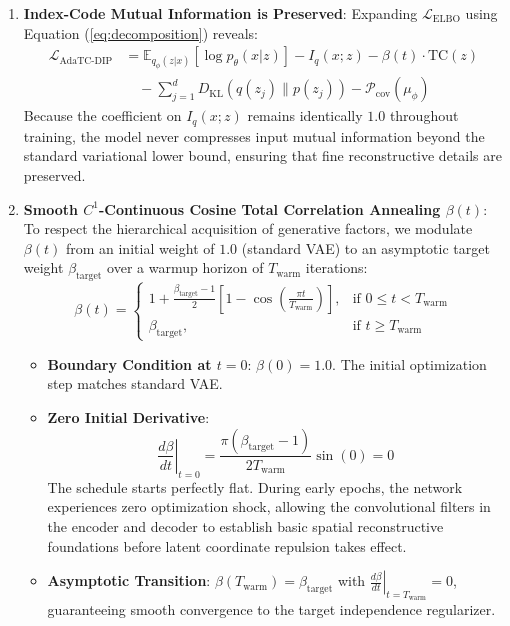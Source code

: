 \documentclass[10pt,journal,compsoc]{IEEEtran}
\begin{document}
\begin{enumerate}
    \item \textbf{Index-Code Mutual Information is Preserved}:
    Expanding $\mathcal{L}_{\text{ELBO}}$ using Equation (\ref{eq:decomposition}) reveals:
    \begin{equation}
    \begin{aligned}
    \mathcal{L}_{\text{AdaTC-DIP}} &= \mathbb{E}_{q_\phi(z|x)}[\log p_\theta(x|z)] - I_q(x; z) - \beta(t) \cdot \text{TC}(z) \\
    &\quad - \sum_{j=1}^d D_{\text{KL}}(q(z_j) \parallel p(z_j)) - \mathcal{P}_{\text{cov}}(\mu_\phi)
    \end{aligned}
    \end{equation}
    Because the coefficient on $I_q(x; z)$ remains identically $1.0$ throughout training, the model never compresses input mutual information beyond the standard variational lower bound, ensuring that fine reconstructive details are preserved.

    \item \textbf{Smooth $C^1$-Continuous Cosine Total Correlation Annealing $\beta(t)$}:
    To respect the hierarchical acquisition of generative factors, we modulate $\beta(t)$ from an initial weight of $1.0$ (standard VAE) to an asymptotic target weight $\beta_{\text{target}}$ over a warmup horizon of $T_{\text{warm}}$ iterations:
    \begin{equation}
    \beta(t) = \begin{cases} 1 + \frac{\beta_{\text{target}} - 1}{2} \left[ 1 - \cos\left( \frac{\pi t}{T_{\text{warm}}} \right) \right], & \text{if } 0 \le t < T_{\text{warm}} \\ \beta_{\text{target}}, & \text{if } t \ge T_{\text{warm}} \end{cases}
    \label{eq:cosine_schedule}
    \end{equation}
    \begin{itemize}
        \item \textbf{Boundary Condition at $t = 0$}: $\beta(0) = 1.0$. The initial optimization step matches standard VAE.
        \item \textbf{Zero Initial Derivative}:
        \begin{equation}
        \left.\frac{d\beta}{dt}\right|_{t=0} = \frac{\pi(\beta_{\text{target}} - 1)}{2 T_{\text{warm}}} \sin(0) = 0
        \end{equation}
        The schedule starts perfectly flat. During early epochs, the network experiences zero optimization shock, allowing the convolutional filters in the encoder and decoder to establish basic spatial reconstructive foundations before latent coordinate repulsion takes effect.
        \item \textbf{Asymptotic Transition}: $\beta(T_{\text{warm}}) = \beta_{\text{target}}$ with $\left.\frac{d\beta}{dt}\right|_{t=T_{\text{warm}}} = 0$, guaranteeing smooth convergence to the target independence regularizer.
    \end{itemize}


\end{enumerate}
\end{document}
